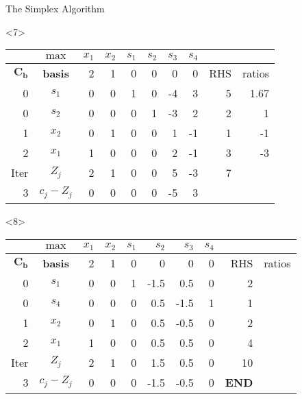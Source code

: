 \begin{frameExample}{The Simplex Algorithm}{}
\begin{onlyenv}<7>
      {\centering
      \begin{tabular}{rc|rrrrrr|rr}
  &  $\max$ & $x_1$ & $x_2$ & $s_1$ &$ s_2$ & $s_3$ & $s_4$ & & \\
  \toprule
$\mathbf{C_b}$ & \textbf{basis} & 2 & 1 & 0 & 0 & 0 & 0 & RHS & ratios \\
  \midrule
0 & $s_1$ & 0 & 0 & 1 & 0 & -4 & 3 & 5 & 1.67 \\
0 & $s_2$ & 0 & 0 & 0 & 1 & -3 & \cellcolor{yellow}2 & 2 & 1 \\
1 & $x_2$ & 0 & 1 & 0 & 0 & 1 & -1 & 1 & -1 \\
        2 & $x_1$ & 1 & 0 & 0 & 0 & 2 & -1 & 3 & -3 \\
        \midrule
Iter & $Z_j$ & 2 & 1 & 0 & 0 & 5 & -3 & 7 &  \\
3 & $c_j - Z_j$ & 0 & 0 & 0 & 0 & -5 & 3 &  & 
\end{tabular}
  \par}
\end{onlyenv}

\begin{onlyenv}<8>
      {\centering
      \begin{tabular}{rc|rrrrrr|rr}
  &  $\max$ & $x_1$ & $x_2$ & $s_1$ &$ s_2$ & $s_3$ & $s_4$ & & \\
  \toprule
$\mathbf{C_b}$ & \textbf{basis} & 2 & 1 & 0 & 0 & 0 & 0 & RHS & ratios \\
  \midrule
0 & $s_1$ & 0 & 0 & 1 & -1.5 & 0.5 & 0 & 2 &  \\
0 & $s_4$ & 0 & 0 & 0 & 0.5 & -1.5 & \cellcolor{yellow}1 & 1 &  \\
1 & $x_2$ & 0 & 1 & 0 & 0.5 & -0.5 & 0 & 2 &  \\
        2 & $x_1$ & 1 & 0 & 0 & 0.5 & 0.5 & 0 & 4 &  \\
        \midrule
Iter & $Z_j$ & 2 & 1 & 0 & 1.5 & 0.5 & 0 & 10 &  \\
3 & $c_j - Z_j$ & 0 & 0 & 0 & -1.5 & -0.5 & 0 &\textbf{END}  & 
\end{tabular}
  \par}
\end{onlyenv}


\end{frameExample}
